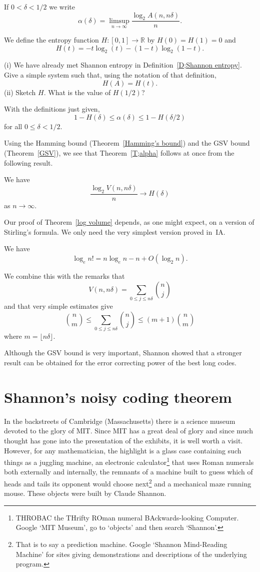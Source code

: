 \begin{definition} If $0<\delta<1/2$ we write
\[\alpha(\delta)=\limsup_{n\rightarrow\infty}
\frac{\log_{2} A(n,n\delta)}{n}.\]
\end{definition}
\begin{definition} We define the entropy
function $H:[0,1]\rightarrow{\mathbb R}$
by $H(0)=H(1)=0$ and
\[H(t)=-t\log_{2}(t)-(1-t)\log_{2}(1-t).\]
\end{definition}
\begin{exercise} (i) We have already met
Shannon entropy in Definition~\ref{D;Shannon entropy}.
Give a simple system such that, using the notation 
of that definition,
\[H(A)=H(t).\]
(ii) Sketch $H$. What is the value of $H(1/2)$?
\end{exercise}
\begin{theorem}\label{T;alpha}
With the definitions just given,
\[1-H(\delta)\leq\alpha(\delta)\leq 1-H(\delta/2)\]
for all $0\leq \delta<1/2$.
\end{theorem}
Using the Hamming bound (Theorem~\ref{Hamming's bound})
and the GSV bound (Theorem~\ref{GSV}), we see that
Theorem~\ref{T;alpha} follows at once from the
following result.
\begin{theorem}\label{log volume} We have
\[\frac{\log_{2}V(n,n\delta)}{n}
\rightarrow H(\delta)\]
as $n\rightarrow\infty$.
\end{theorem}
Our proof of Theorem~\ref{log volume} depends, as
one might expect, on a version of Stirling's formula.
We only need the very simplest version proved
in~IA.
\begin{lemma}[Stirling] We have
\[\log_{e} n!=n\log_{e}n-n+O(\log_{2}n).\]
\end{lemma}
We combine this with the remarks that
\[V(n,n\delta)=\sum_{0\leq j\leq n\delta}
\binom{n}{j}\]
and that very simple estimates give
\[\binom{n}{m}\leq \sum_{0\leq j\leq n\delta}
\binom{n}{j}
\leq (m+1)\binom{n}{m}\]
where $m=\lfloor n\delta\rfloor$.

Although the GSV bound is very important,
Shannon showed that
a stronger result can be obtained for the
error correcting power of the best long codes.
\section{Shannon's noisy coding theorem}
In the backstreets of Cambridge
(Massachusetts) there is a science museum devoted to
the glory of MIT. Since MIT has a great deal of glory
and since much thought has gone into the presentation
of the exhibits, it is well worth a visit. However,
for any mathematician, the highlight is a glass case
containing such things as a juggling machine,
an electronic calculator\footnote{THROBAC
the THrifty ROman numeral BAckwards-looking Computer.
Google `MIT Museum', go to `objects'  and then
search `Shannon'.}
that uses Roman numerals both externally and internally,
the remnants of a machine built to guess which
of heads and tails its opponent would choose 
next\footnote{That is to say a prediction machine.
Google `Shannon Mind-Reading Machine' for sites
giving demonstrations and descriptions of the underlying program.}
and a mechanical maze running mouse.
These objects were built by Claude Shannon.

